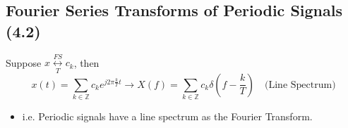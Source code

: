 \subsection{Fourier Series Transforms of Periodic Signals (4.2)}
\begin{definition}
    Suppose \( x \underset{T}{\overset{FS}{\leftrightarrow}} c_k \), then
    \[
    x(t) = \sum_{k \in \mathbb{Z}} c_k e^{j 2 \pi \frac{k}{T} t} \rightarrow X(f) = \sum_{k \in \mathbb{Z}} c_k \delta\left(f - \frac{k}{T}\right) \quad \text{(Line Spectrum)}
    \]
    \begin{itemize}
        \item i.e. Periodic signals have a line spectrum as the Fourier Transform.
    \end{itemize}
\end{definition}

